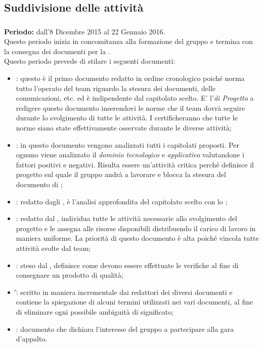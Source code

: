 \subsection{Suddivisione delle attività}

\subsubsection{\AR}
\textbf{Periodo:} dall'8 Dicembre 2015 al 22 Gennaio 2016.\\
Questo periodo inizia in concomitanza alla formazione del gruppo e termina con la consegna dei documenti per la \textbf{\RR}.\\ 
Questo periodo prevede di stilare i seguenti documenti:
\begin{itemize}
		\item \textit{\NdP}: questo è il primo documento redatto in ordine cronologico poiché norma tutto l'operato del team riguardo la stesura dei documenti, delle comunicazioni, etc. ed è indipendente dal capitolato scelto. E' l’\textit{\Amm di Progetto} a redigere questo documento inserendovi le norme che il team dovrà seguire durante lo svolgimento di tutte le attività. I \textit{\Vers} certificheranno che tutte le norme siano state effettivamente osservate durante le diverse attività;
		\item \textit{\SdF}: in questo documento vengono analizzati tutti i capitolati proposti. Per ognuno viene analizzato il \textit{dominio tecnologico} e \textit{applicativo} valutandone i fattori positivi e negativi. Risulta essere un'attività	critica perché definisce il progetto sul quale il gruppo andrà a lavorare e blocca la stesura del documento di \textit{\AdR};
		\item \textit{\AdR}: redatto dagli \textit{\Anas}, è l'analisi approfondita del capitolato scelto con lo \textit{\SdF};
		\item \textit{\PdP}: redatto dal \textit{\RdP}, individua tutte le attività necessarie allo svolgimento del progetto e le assegna alle risorse disponibili distribuendo il carico di lavoro in maniera uniforme.
		La priorità di questo documento è alta poiché vincola tutte attività svolte dal team;
		\item \textit{\PdQ}: steso dal \textit{\Ver}, definisce come devono essere effettuate le verifiche al fine di consegnare un prodotto di qualità;
		\item \textit{\G}: scritto in maniera incrementale dai redattori dei diversi documenti e contiene la spiegazione di alcuni termini utilizzati nei vari documenti, al fine di eliminare ogni possibile ambiguità di significato;
		\item \textit{\LdP}: documento che dichiara l’interesse del gruppo a partecipare alla gara d’appalto.
\end{itemize}
